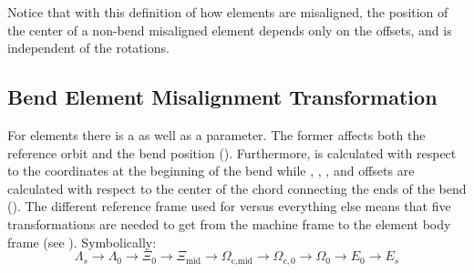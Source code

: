 Notice that with this definition of how elements are misaligned, the position of the center of a
non-bend misaligned element depends only on the offsets, and is independent of the rotations.

\subsection{Bend Element Misalignment Transformation}
\label{s:bend.mis}

For  elements there is a  as well as a  parameter.
The former affects both the reference orbit and
the bend position (). Furthermore,  is calculated with respect to
the coordinates at the beginning of the bend while , ,
, and offsets are calculated with respect to the center of the chord connecting the
ends of the bend (). 
The different reference frame used
for  versus everything else means that five transformations are needed to get from the
machine frame to the element body frame (see ). Symbolically:
\begin{equation}
  \Lambda_s \longrightarrow \Lambda_0 \longrightarrow
  \Xi_0 \longrightarrow \Xi_\text{mid} \longrightarrow 
  \Omega_\text{c,mid} \longrightarrow \Omega_{c,0} \longrightarrow 
  \Omega_{0} \longrightarrow E_0 \longrightarrow E_s
\end{equation}

